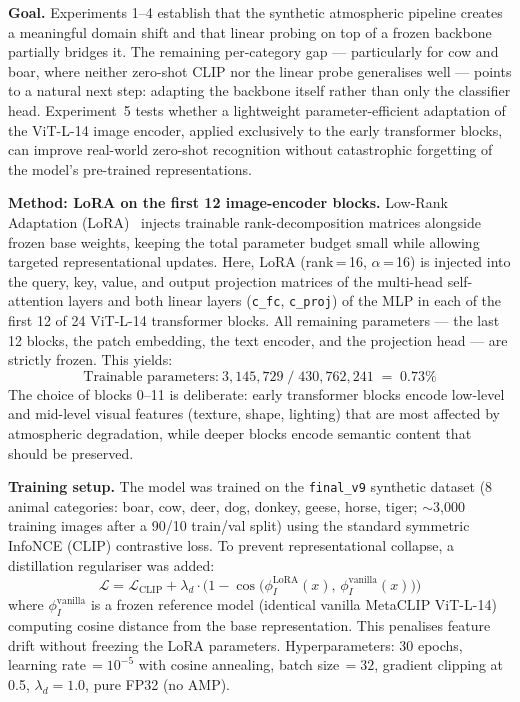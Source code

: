 \noindent \textbf{Goal.} Experiments 1--4 establish that the synthetic atmospheric pipeline creates a meaningful domain shift and that linear probing on top of a frozen backbone partially bridges it. The remaining per-category gap --- particularly for cow and boar, where neither zero-shot CLIP nor the linear probe generalises well --- points to a natural next step: adapting the backbone itself rather than only the classifier head. Experiment~5 tests whether a lightweight parameter-efficient adaptation of the ViT-L-14 image encoder, applied exclusively to the early transformer blocks, can improve real-world zero-shot recognition without catastrophic forgetting of the model's pre-trained representations.

\noindent \textbf{Method: LoRA on the first 12 image-encoder blocks.}
Low-Rank Adaptation (LoRA)~\citep{hu2022lora} injects trainable rank-decomposition matrices alongside frozen base weights, keeping the total parameter budget small while allowing targeted representational updates. Here, LoRA (rank\,=\,16, $\alpha$\,=\,16) is injected into the query, key, value, and output projection matrices of the multi-head self-attention layers and both linear layers (\texttt{c\_fc}, \texttt{c\_proj}) of the MLP in each of the first 12 of 24 ViT-L-14 transformer blocks. All remaining parameters --- the last 12 blocks, the patch embedding, the text encoder, and the projection head --- are strictly frozen. This yields:
\[
  \text{Trainable parameters:}\ 3{,}145{,}729 \;\Big/\; 430{,}762{,}241 \;=\; 0.73\%
\]
The choice of blocks 0--11 is deliberate: early transformer blocks encode low-level and mid-level visual features (texture, shape, lighting) that are most affected by atmospheric degradation, while deeper blocks encode semantic content that should be preserved.

\noindent \textbf{Training setup.} The model was trained on the \texttt{final\_v9} synthetic dataset (8 animal categories: boar, cow, deer, dog, donkey, geese, horse, tiger; $\sim$3{,}000 training images after a 90/10 train/val split) using the standard symmetric InfoNCE (CLIP) contrastive loss. To prevent representational collapse, a distillation regulariser was added:
\[
  \mathcal{L} = \mathcal{L}_{\text{CLIP}} + \lambda_d \cdot \bigl(1 - \cos\!\bigl(\phi_I^{\text{LoRA}}(x),\, \phi_I^{\text{vanilla}}(x)\bigr)\bigr)
\]
where $\phi_I^{\text{vanilla}}$ is a frozen reference model (identical vanilla MetaCLIP ViT-L-14) computing cosine distance from the base representation. This penalises feature drift without freezing the LoRA parameters. Hyperparameters: 30 epochs, learning rate\,$=10^{-5}$ with cosine annealing, batch size\,$=32$, gradient clipping at 0.5, $\lambda_d = 1.0$, pure FP32 (no AMP).

